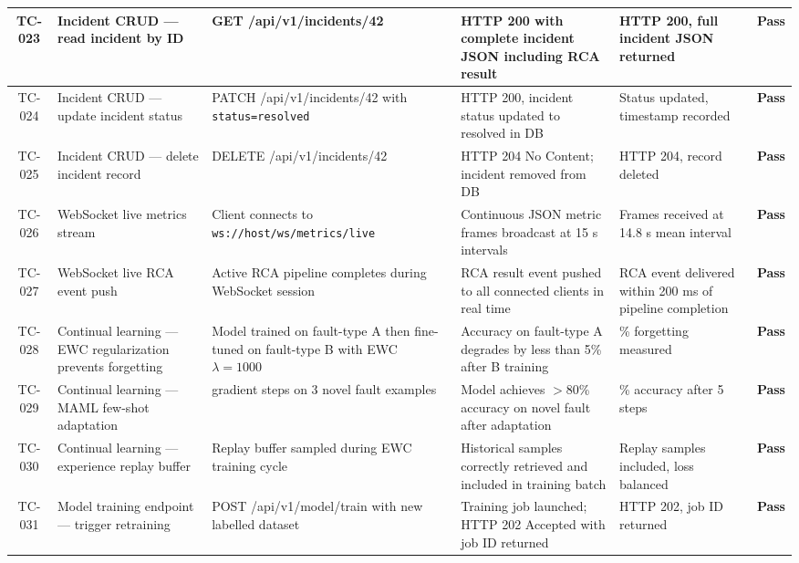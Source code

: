 \begin{center}
\begin{longtable}{|c|>{\RaggedRight\arraybackslash}p{3.2cm}|>{\RaggedRight\arraybackslash}p{3.5cm}|>{\RaggedRight\arraybackslash}p{3.5cm}|>{\RaggedRight\arraybackslash}p{2.2cm}|c|}
TC-023 & Incident CRUD — read incident by ID & GET /api/v1/incidents/42 & HTTP 200 with complete incident JSON including RCA result & HTTP 200, full incident JSON returned & \textbf{Pass} \\
\hline

TC-024 & Incident CRUD — update incident status & PATCH /api/v1/incidents/42 with \texttt{status=resolved} & HTTP 200, incident status updated to resolved in DB & Status updated, timestamp recorded & \textbf{Pass} \\
\hline

TC-025 & Incident CRUD — delete incident record & DELETE /api/v1/incidents/42 & HTTP 204 No Content; incident removed from DB & HTTP 204, record deleted & \textbf{Pass} \\
\hline

TC-026 & WebSocket live metrics stream & Client connects to \texttt{ws://host/ws/metrics/live} & Continuous JSON metric frames broadcast at 15 s intervals & Frames received at 14.8 s mean interval & \textbf{Pass} \\
\hline

TC-027 & WebSocket live RCA event push & Active RCA pipeline completes during WebSocket session & RCA result event pushed to all connected clients in real time & RCA event delivered within 200 ms of pipeline completion & \textbf{Pass} \\
\hline

TC-028 & Continual learning — EWC regularization prevents forgetting & Model trained on fault-type A then fine-tuned on fault-type B with EWC $\lambda=1000$ & Accuracy on fault-type A degrades by less than 5\% after B training & 3.1\% forgetting measured & \textbf{Pass} \\
\hline

TC-029 & Continual learning — MAML few-shot adaptation & 5 gradient steps on 3 novel fault examples & Model achieves $>$80\% accuracy on novel fault after adaptation & 84\% accuracy after 5 steps & \textbf{Pass} \\
\hline

TC-030 & Continual learning — experience replay buffer & Replay buffer sampled during EWC training cycle & Historical samples correctly retrieved and included in training batch & Replay samples included, loss balanced & \textbf{Pass} \\
\hline

TC-031 & Model training endpoint — trigger retraining & POST /api/v1/model/train with new labelled dataset & Training job launched; HTTP 202 Accepted with job ID returned & HTTP 202, job ID returned & \textbf{Pass} \\
\hline


\end{longtable}
\end{center}
